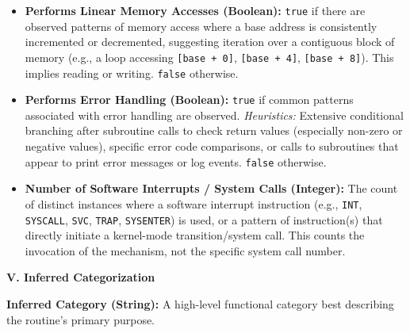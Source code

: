 \begin{tcolorbox}
\begin{itemize}[noitemsep, topsep=1pt]
\item \textbf{Performs Linear Memory Accesses (Boolean):} \texttt{true} if there are observed patterns of memory access where a base address is consistently incremented or decremented, suggesting iteration over a contiguous block of memory (e.g., a loop accessing \texttt{[base + 0]}, \texttt{[base + 4]}, \texttt{[base + 8]}). This implies reading or writing. \texttt{false} otherwise.
\item \textbf{Performs Error Handling (Boolean):} \texttt{true} if common patterns associated with error handling are observed.
   \textit{Heuristics:} Extensive conditional branching after subroutine calls to check return values (especially non-zero or negative values), specific error code comparisons, or calls to subroutines that appear to print error messages or log events. \texttt{false} otherwise.
\item \textbf{Number of Software Interrupts / System Calls (Integer):} The count of distinct instances where a software interrupt instruction (e.g., \texttt{INT}, \texttt{SYSCALL}, \texttt{SVC}, \texttt{TRAP}, \texttt{SYSENTER}) is used, or a pattern of instruction(s) that directly initiate a kernel-mode transition/system call. This counts the invocation of the mechanism, not the specific system call number.
\end{itemize}
\textbf{V. Inferred Categorization}

\textbf{Inferred Category (String):} A high-level functional category best describing the routine's primary purpose.


\end{tcolorbox}
